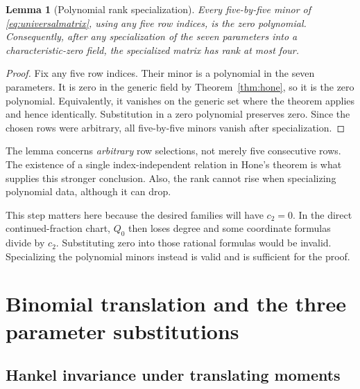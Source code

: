 \documentclass[11pt,letterpaper]{article}
\numberwithin{equation}{section}
\newtheorem{lemma}[theorem]{Lemma}
\theoremstyle{definition}
\begin{document}
\begin{lemma}[Polynomial rank specialization]
\label{lem:specialization}
Every five-by-five minor of \eqref{eq:universalmatrix}, using any five row
indices, is the zero polynomial. Consequently, after any specialization of
the seven parameters into a characteristic-zero field, the specialized
matrix has rank at most four.
\end{lemma}
\begin{proof}
Fix any five row indices. Their minor is a polynomial in the seven
parameters. It is zero in the generic field by Theorem~\ref{thm:hone}, so
it is the zero polynomial. Equivalently, it vanishes on the generic set
where the theorem applies and hence identically. Substitution in a zero
polynomial preserves zero. Since the chosen rows were arbitrary, all
five-by-five minors vanish after specialization.
\end{proof}

The lemma concerns \emph{arbitrary} row selections, not merely five
consecutive rows. The existence of a single index-independent relation in
Hone's theorem is what supplies this stronger conclusion. Also, the rank
cannot rise when specializing polynomial data, although it can drop.

This step matters here because the desired families will have \(c_2=0\).
In the direct continued-fraction chart, \(Q_0\) then loses degree and some
coordinate formulas divide by \(c_2\). Substituting zero into those rational
formulas would be invalid. Specializing the polynomial minors instead is
valid and is sufficient for the proof.

\section{Binomial translation and the three parameter substitutions}
\label{sec:translation}

\subsection{Hankel invariance under translating moments}
\end{document}

